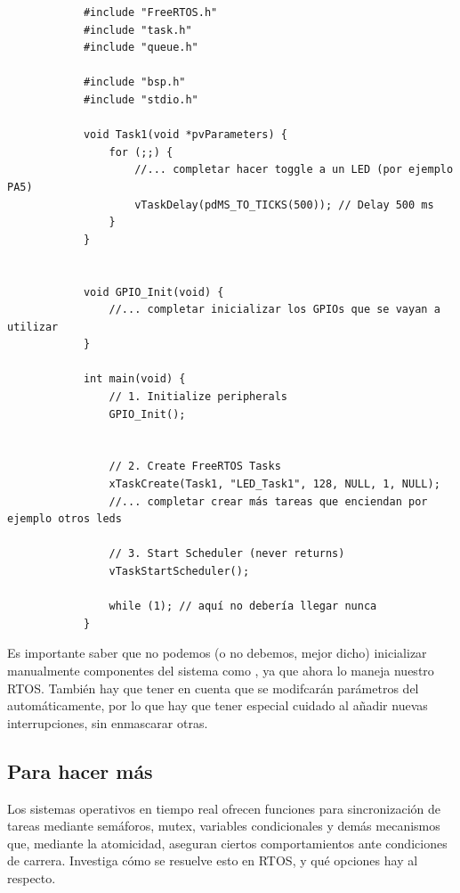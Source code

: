 \documentclass[../main.tex]{subfiles}
\begin{document}
        \begin{lstlisting}
            #include "FreeRTOS.h"
            #include "task.h"
            #include "queue.h"

            #include "bsp.h"
            #include "stdio.h"

            void Task1(void *pvParameters) {
                for (;;) {
                    //... completar hacer toggle a un LED (por ejemplo PA5)
                    vTaskDelay(pdMS_TO_TICKS(500)); // Delay 500 ms
                }
            }


            void GPIO_Init(void) {
                //... completar inicializar los GPIOs que se vayan a utilizar
            }

            int main(void) {
                // 1. Initialize peripherals
                GPIO_Init();


                // 2. Create FreeRTOS Tasks
                xTaskCreate(Task1, "LED_Task1", 128, NULL, 1, NULL);
                //... completar crear más tareas que enciendan por ejemplo otros leds

                // 3. Start Scheduler (never returns)
                vTaskStartScheduler();

                while (1); // aquí no debería llegar nunca
            }
        \end{lstlisting}

        Es importante saber que no podemos (o no debemos, mejor dicho) inicializar manualmente componentes del sistema como , ya que ahora lo maneja nuestro RTOS. También hay que tener en cuenta que se modifcarán parámetros del  automáticamente, por lo que hay que tener especial cuidado al añadir nuevas interrupciones, sin enmascarar otras.
        


    \subsection{Para hacer más}

        Los sistemas operativos en tiempo real ofrecen funciones para sincronización de tareas mediante semáforos, mutex, variables condicionales y demás mecanismos que, mediante la atomicidad, aseguran ciertos comportamientos ante condiciones de carrera. Investiga cómo se resuelve esto en RTOS, y qué opciones hay al respecto.
 
\end{document}
